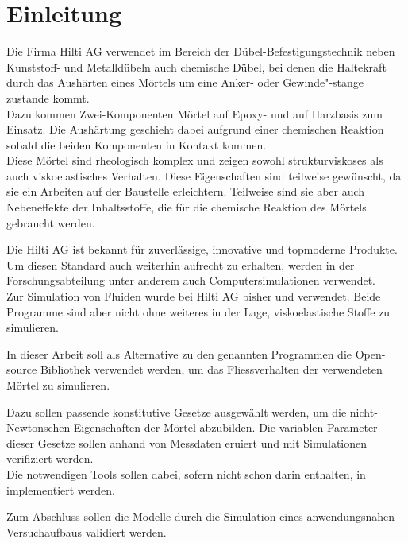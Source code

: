 \section{Einleitung}
\label{Kapitel:Einleitung}
Die Firma Hilti AG verwendet im Bereich der Dübel-Befestigungstechnik neben Kunststoff- und Metalldübeln auch chemische Dübel, bei denen die Haltekraft durch das Aushärten eines Mörtels um eine Anker- oder Gewinde"-stange zustande kommt. \\
Dazu kommen Zwei-Komponenten Mörtel auf Epoxy- und auf Harzbasis zum Einsatz. Die Aushärtung geschieht dabei aufgrund einer chemischen Reaktion sobald die beiden Komponenten in Kontakt kommen.\\
Diese Mörtel sind rheologisch komplex und zeigen sowohl strukturviskoses als auch viskoelastisches Verhalten. Diese Eigenschaften sind teilweise gewünscht, da sie ein Arbeiten auf der Baustelle erleichtern. Teilweise sind sie aber auch Nebeneffekte der Inhaltsstoffe, die für die chemische Reaktion des Mörtels gebraucht werden.

Die Hilti AG ist bekannt für zuverlässige, innovative und topmoderne Produkte. Um diesen Standard auch weiterhin aufrecht zu erhalten, werden in der Forschungsabteilung unter anderem auch Computersimulationen verwendet. \\
Zur Simulation von Fluiden wurde bei Hilti AG bisher \comsol{} und \cfx{} verwendet. Beide Programme sind aber nicht ohne weiteres in der Lage, viskoelastische Stoffe zu simulieren.%

In dieser Arbeit soll als Alternative zu den genannten Programmen die Open-source Bibliothek \openfoam{} \cite{openfoam} verwendet werden, um das Fliessverhalten der verwendeten Mörtel zu simulieren.

Dazu sollen passende konstitutive Gesetze ausgewählt werden, um die nicht-Newtonschen Eigenschaften der Mörtel abzubilden. Die variablen Parameter dieser Gesetze sollen anhand von Messdaten eruiert und mit Simulationen verifiziert werden.\\
Die notwendigen Tools sollen dabei, sofern nicht schon darin enthalten, in \openfoam{} implementiert werden.

Zum Abschluss sollen die Modelle durch die Simulation eines anwendungsnahen Versuchaufbaus validiert werden.
